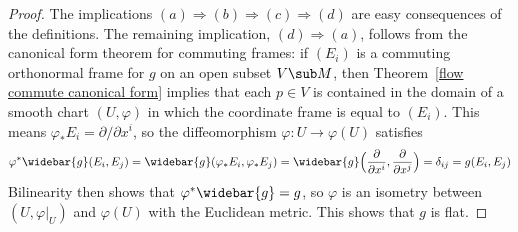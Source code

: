 \begin{proof}
The implications $(a)\Rightarrow(b)\Rightarrow(c)\Rightarrow(d)$ are easy consequences of the definitions. The remaining implication, $(d)\Rightarrow(a)$, follows from the canonical form theorem for commuting frames: if $(E_i)$ is a commuting orthonormal frame for $g$ on an open subset $V\sub M$, then Theorem~\ref{flow commute canonical form} implies that each $p\in V$ is contained in the domain of a smooth chart $(U,\varphi)$ in which the coordinate frame is equal to $(E_i)$. This means $\varphi_*E_i=\partial/\partial x^i$, so the diffeomorphism $\varphi:U\to\varphi(U)$ satisfies
\[\varphi^*\widebar{g}(E_i,E_j)=\widebar{g}(\varphi_*E_i,\varphi_*E_j)=\widebar{g}\Big(\frac{\partial}{\partial x^i},\frac{\partial}{\partial x^j}\Big)=\delta_{ij}=g(E_i,E_j)\]
Bilinearity then shows that $\varphi^*\widebar{g}=g$, so $\varphi$ is an isometry between $(U,\varphi|_U)$ and $\varphi(U)$ with the Euclidean metric. This shows that $g$ is flat.
\end{proof}
